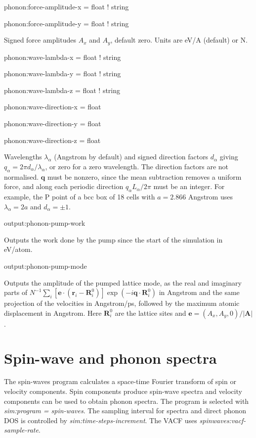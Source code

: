 {\zicf phonon:force-amplitude-x = float ! string}
{\zicf phonon:force-amplitude-y = float ! string}
Signed force amplitudes $A_x$ and $A_y$, default zero. Units are eV/A (default) or N.

{\zicf phonon:wave-lambda-x = float ! string}
{\zicf phonon:wave-lambda-y = float ! string}
{\zicf phonon:wave-lambda-z = float ! string}
{\zicf phonon:wave-direction-x = float}
{\zicf phonon:wave-direction-y = float}
{\zicf phonon:wave-direction-z = float}
Wavelengths $\lambda_\alpha$ (Angstrom by default) and signed direction factors $d_\alpha$ giving $q_\alpha=2\pi d_\alpha/\lambda_\alpha$, or zero for a zero wavelength. The direction factors are not normalised. $\mathbf q$ must be nonzero, since the mean subtraction removes a uniform force, and along each periodic direction $q_\alpha L_\alpha/2\pi$ must be an integer. For example, the P point of a bcc box of 18 cells with $a=2.866$ Angstrom uses $\lambda_\alpha=2a$ and $d_\alpha=\pm1$.

{\zicf output:phonon-pump-work}
Outputs the work done by the pump since the start of the simulation in eV/atom.

{\zicf output:phonon-pump-mode}
Outputs the amplitude of the pumped lattice mode, as the real and imaginary parts of $N^{-1}\sum_i[\mathbf e\cdot(\mathbf r_i-\mathbf R_i^0)]\exp(-i\mathbf q\cdot\mathbf R_i^0)$ in Angstrom and the same projection of the velocities in Angstrom/ps, followed by the maximum atomic displacement in Angstrom. Here $\mathbf R_i^0$ are the lattice sites and $\mathbf e=(A_x,A_y,0)/|\mathbf A|$.

\section*{Spin-wave and phonon spectra}
The spin-waves program calculates a space-time Fourier transform of spin or velocity components. 
Spin components produce spin-wave spectra and velocity components can be used to obtain phonon spectra. 
The program is selected with \textit{sim:program = spin-waves}. The sampling interval for spectra and direct phonon DOS is controlled by \textit{sim:time-steps-increment}. The VACF uses \textit{spinwaves:vacf-sample-rate}.


